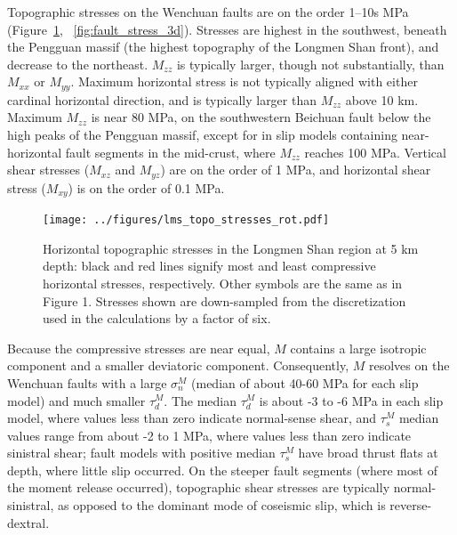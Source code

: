\documentclass[twocolumn,jgrga]{AGUTeX}
\begin{document}
\begin{article}
Topographic stresses on the Wenchuan faults are on the order 1--10s MPa
(Figure~\ref{fig:lms_topo_stresses_rot}, ~\ref{fig:fault_stress_3d}). 
Stresses are highest in the southwest,
beneath the Pengguan massif (the highest topography of the Longmen Shan
front), and decrease to the northeast. $M_{zz}$ is typically larger,
though not substantially, than $M_{xx}$ or $M_{yy}$. Maximum horizontal
stress is not typically aligned with either cardinal horizontal
direction, and is typically larger than $M_{zz}$ above 10 km. Maximum
$M_{zz}$ is near 80 MPa, on the southwestern Beichuan fault below the
high peaks of the Pengguan massif, except for in slip models containing
near-horizontal fault segments in the mid-crust, where $M_{zz}$ reaches
100 MPa. Vertical shear stresses ($M_{xz}$ and $M_{yz}$) are on the
order of 1 MPa, and horizontal shear stress ($M_{xy}$) is on the order
of 0.1 MPa.

\begin{figure}[t]
\centering
\texttt{[image: ../figures/lms\_topo\_stresses\_rot.pdf]}
\caption{Horizontal topographic stresses in the Longmen Shan region at 5
km depth: black and red lines signify most and least compressive
horizontal stresses, respectively. Other symbols are the same as in Figure
1. Stresses shown are down-sampled from the
discretization used in the calculations by a factor of six.}
\label{fig:lms_topo_stresses_rot}
\end{figure}

Because the compressive stresses are near equal, $M$ contains a large
isotropic component and a smaller deviatoric component. Consequently, $M$
resolves on the Wenchuan faults with a large $\sigma^M_n$ (median of
about 40-60 MPa for each slip model) and much smaller $\tau^M_d$. The
median $\tau^M_d$ is about -3 to -6 MPa in each slip model, where values
less than zero indicate normal-sense shear, and $\tau^M_s$ median values
range from about -2 to 1 MPa, where values less than zero indicate
sinistral shear; fault models with positive median $\tau^M_s$ have broad
thrust flats at depth, where little slip occurred. On the steeper fault
segments (where most of the moment release occurred), topographic shear
stresses are typically normal-sinistral, as opposed to the dominant mode
of coseismic slip, which is reverse-dextral.


\end{article}
\end{document}
